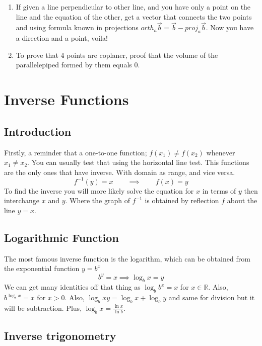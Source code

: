 \documentclass{article}
\begin{document}
\begin{enumerate}[1.]
		\item If given a line perpendicular to other line, and you have only a point on the line and the equation of the other, get a vector that connects the two points and using formula known in projections  
			$	orth_a \vec{ b } = \vec{ b } - proj_a \vec{ b }$. Now you have a direction and a point, voila!

		\item To prove that 4 points are coplaner, proof that the volume of the parallelepiped formed by them equals 0.

	\end{enumerate}


	\newpage

	\section{Inverse Functions}

	\subsection{Introduction}

	Firstly, a reminder that a one-to-one function; $f(x_1) \neq f(x_2)$ whenever $ x_1 \neq x_2 $.
	You can usually test that using the horizontal line test.
	This functions are the only ones that have inverse. 
	With domain as range, and vice versa.
	\[
		f^{-1}(y)=x \qquad \implies \qquad  f(x)=y
	\]
	To find the inverse you will more likely solve the equation for $x$ in terms of $ y $ then interchange $ x $ and $ y $.
	Where the graph of $ f^{-1} $ is obtained by reflection $f$ about  the line $y=x$.

	\subsection{Logarithmic Function}

	The most famous inverse function is the logarithm, which can be obtained from the exponential function $y=b^x$
	\[
		b^y=x \implies \log_bx=y
	\]
	We can get many identities off that thing as $ \log_b{b^x}=x$ for $x \in \mathbb{R}$. Also, $b^{\log_b{x}}=x$ for $x>0$. Also, $\log_b{xy}=\log_bx+\log_by$ and same for division but it will be subtraction. Plus, $\log_b{x}= \frac{ \ln{x} }{ \ln{b} }.$

	\subsection{Inverse trigonometry}
\end{document}

